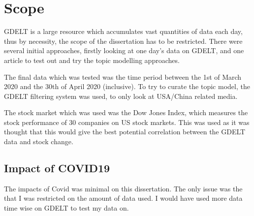 \section{Scope}

GDELT is a large resource which accumulates vast quantities of data each day, thus by necessity, the scope of the dissertation has to be restricted. There were several initial approaches, firstly looking at one day's data on GDELT, and one article to test out and try the topic modelling approaches. 

The final data which was tested was the time period between the 1st of March 2020 and the 30th of April 2020 (inclusive). To try to curate the topic model, the GDELT filtering system was used, to only look at USA/China related media. 

The stock market which was used was the Dow Jones Index, which measures the stock performance of 30 companies on US stock markets. This was used as it was thought that this would give the best potential correlation between the GDELT data and stock change. 


\subsection{Impact of COVID19}
The impacts of Covid was minimal on this dissertation. The only issue was the that I was restricted on the amount of data used. I would have used more data time wise on GDELT to test my data on.